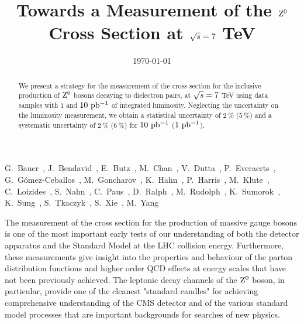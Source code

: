 \documentclass{cmspaper}
\begin{document}
%
\begin{titlepage}
\date{\today}
\title{Towards a Measurement of the $\mathrm{Z^0}$ Cross Section at $\sqrt{s} = 7$ TeV}

\begin{Authlist}
%
G.~Bauer~,
J.~Bendavid~,
E.~Butz~,
M.~Chan~,
V.~Dutta~,
P.~Everaerts~,
G.~G\'omez-Ceballos~,
M.~Goncharov~,
K.~Hahn~,
P.~Harris~,
M.~Klute~,
C.~Loizides~,
S.~Nahn~,
C.~Paus~,
D.~Ralph~,
M.~Rudolph~,
K.~Sumorok~,
K.~Sung~,
S.~Tkaczyk~,
S.~Xie~,
M.~Yang~
%
\end{Authlist}



\begin{abstract}
We present a strategy for the measurement of the cross section for the inclusive production of $\mathrm{Z^0}$ bosons decaying to dielectron pairs, at $\sqrt{s} = 7$ TeV using data samples with $1$ and $10\ \mathrm{pb^{-1}}$ of integrated luminosity. Neglecting the uncertainty on the luminosity measurement, we obtain a statistical uncertainty of $2\ \%$ ($5\ \%$) and a systematic uncertainty of $2\ \%$ ($6\ \%$) for $10\ \mathrm{pb^{-1}}$ ($1\ \mathrm{pb^{-1}}$).


\end{abstract}
\end{titlepage}
%
\tableofcontents
\newpage
%










The measurement of the cross section for the production of massive gauge bosons is one of the most important early tests of our understanding of both the detector apparatus and the Standard Model at the LHC collision energy.  Furthermore, these measurements give insight into the properties and behaviour of the parton distribution functions and higher order QCD effects at energy scales that have not been previously achieved. The leptonic decay channels of the $\mathrm{Z^0}$ boson, in particular, provide one of the cleanest "standard candles" for achieving comprehensive understanding of the CMS detector and of the various standard model processes that are important backgrounds for searches of new physics. 
\end{document}
